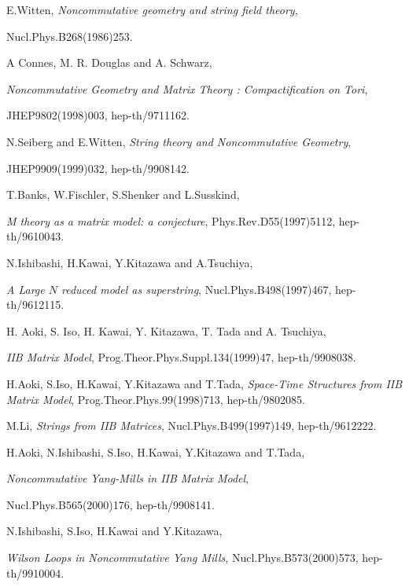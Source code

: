 \documentclass[a4paper,11pt]{article}
\begin{document}
\begin{thebibliography}{99}


E.Witten, 
{\it Noncommutative geometry and string field theory}, 

Nucl.Phys.B268(1986)253. 

A Connes, M. R. Douglas and A. Schwarz, 

{\it Noncommutative Geometry and Matrix Theory
     : Compactification on Tori}, 

JHEP9802(1998)003, hep-th/9711162. 



N.Seiberg and E.Witten, 
{\it String theory and Noncommutative Geometry}, 

JHEP9909(1999)032, hep-th/9908142.

T.Banks, W.Fischler, S.Shenker and L.Susskind, 

{\it M theory as a matrix model: a conjecture}, 
Phys.Rev.D55(1997)5112, hep-th/9610043.

N.Ishibashi, H.Kawai, Y.Kitazawa and A.Tsuchiya, 

{\it A Large $N$ reduced model as superstring}, 
Nucl.Phys.B498(1997)467, hep-th/9612115.


H. Aoki, S. Iso, H. Kawai, Y. Kitazawa, T. Tada and  A. Tsuchiya, 

{\it IIB Matrix Model},
Prog.Theor.Phys.Suppl.134(1999)47, hep-th/9908038.

H.Aoki, S.Iso, H.Kawai, Y.Kitazawa and T.Tada, 
{\it Space-Time Structures from IIB Matrix Model}, 
Prog.Theor.Phys.99(1998)713, 
hep-th/9802085. 





M.Li, 
{\it Strings from IIB Matrices}, 
Nucl.Phys.B499(1997)149, hep-th/9612222. 

H.Aoki, N.Ishibashi, S.Iso, H.Kawai, Y.Kitazawa and T.Tada, 

{\it Noncommutative Yang-Mills in IIB Matrix Model}, 

Nucl.Phys.B565(2000)176, hep-th/9908141. 

N.Ishibashi, S.Iso, H.Kawai and Y.Kitazawa, 

{\it Wilson Loops in Noncommutative Yang Mills}, 
Nucl.Phys.B573(2000)573, 
hep-th/9910004.  


\end{thebibliography}
\end{document}
